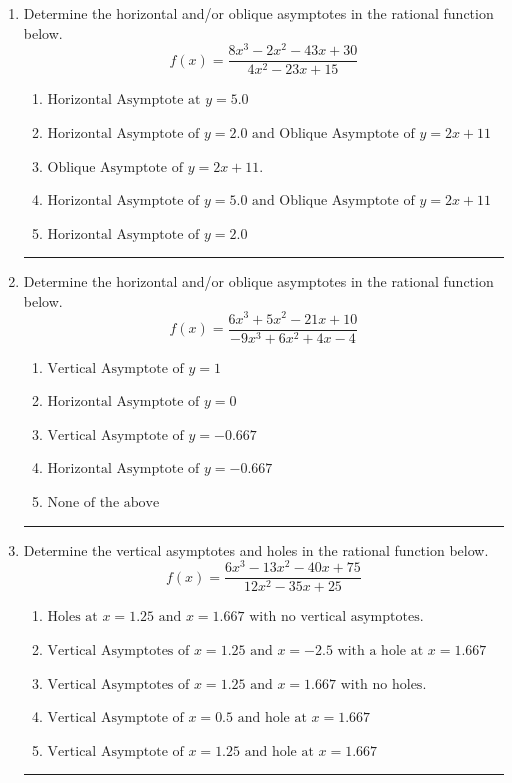 \documentclass[14pt]{extbook}
\newcommand{\litem}[1]{\item#1\hspace*{-1cm}\rule{\textwidth}{0.4pt}}
\begin{document}
\begin{enumerate}
{\begin{enumerate}[label=\Alph*.]
\end{enumerate} }
\litem{
Determine the horizontal and/or oblique asymptotes in the rational function below.\[ f(x) = \frac{8x^{3} -2 x^{2} -43 x + 30}{4x^{2} -23 x + 15} \]\begin{enumerate}[label=\Alph*.]
\item \( \text{Horizontal Asymptote at } y = 5.0 \)
\item \( \text{Horizontal Asymptote of } y = 2.0 \text{ and Oblique Asymptote of } y = 2x + 11 \)
\item \( \text{Oblique Asymptote of } y = 2x + 11. \)
\item \( \text{Horizontal Asymptote of } y = 5.0 \text{ and Oblique Asymptote of } y = 2x + 11 \)
\item \( \text{Horizontal Asymptote of } y = 2.0  \)

\end{enumerate} }
\litem{
Determine the horizontal and/or oblique asymptotes in the rational function below.\[ f(x) = \frac{6x^{3} +5 x^{2} -21 x + 10}{-9x^{3} +6 x^{2} +4 x -4} \]\begin{enumerate}[label=\Alph*.]
\item \( \text{Vertical Asymptote of } y = 1  \)
\item \( \text{Horizontal Asymptote of } y = 0  \)
\item \( \text{Vertical Asymptote of } y = -0.667  \)
\item \( \text{Horizontal Asymptote of } y = -0.667  \)
\item \( \text{None of the above} \)

\end{enumerate} }
\litem{
Determine the vertical asymptotes and holes in the rational function below.\[ f(x) = \frac{6x^{3} -13 x^{2} -40 x + 75}{12x^{2} -35 x + 25} \]\begin{enumerate}[label=\Alph*.]
\item \( \text{Holes at } x = 1.25 \text{ and } x = 1.667 \text{ with no vertical asymptotes.} \)
\item \( \text{Vertical Asymptotes of } x = 1.25 \text{ and } x = -2.5 \text{ with a hole at } x = 1.667 \)
\item \( \text{Vertical Asymptotes of } x = 1.25 \text{ and } x = 1.667 \text{ with no holes.} \)
\item \( \text{Vertical Asymptote of } x = 0.5 \text{ and hole at } x = 1.667 \)
\item \( \text{Vertical Asymptote of } x = 1.25 \text{ and hole at } x = 1.667 \)


\end{enumerate}}
\end{enumerate}
\end{document}
